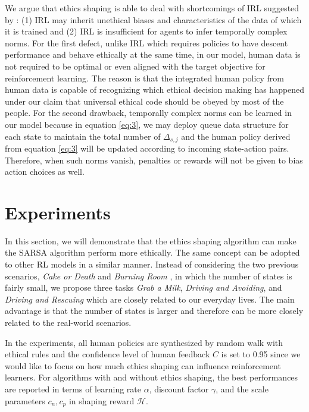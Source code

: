 \documentclass[letterpaper]{article} %
\begin{document}
We argue that ethics shaping is able to deal with shortcomings of IRL suggested by \cite{accountable}: (1) IRL may inherit unethical biases and characteristics of the data of which it is trained and (2) IRL is insufficient for agents to infer temporally complex norms. For the first defect, unlike IRL which requires policies to have descent performance and behave ethically at the same time, in our model, human data is not required to be optimal or even aligned with the target objective for reinforcement learning. The reason is that the integrated human policy from human data is capable of recognizing which ethical decision making has happened under our claim that universal ethical code should be obeyed by most of the people. For the second drawback, temporally complex norms can be learned in our model because in equation \ref{eq:3}, we may deploy queue data structure for each state to maintain the total number of $\Delta_{s,j}$ and the human policy derived from equation \ref{eq:3} will be updated according to incoming state-action pairs. Therefore, when such norms vanish, penalties or rewards will not be given to bias action choices as well.

\section{Experiments}
In this section, we will demonstrate that the ethics shaping algorithm can make the SARSA algorithm perform more ethically. The same concept can be adopted to other RL models in a similar manner. Instead of considering the two previous scenarios, \textit{Cake or Death} \cite{armstrong} and \textit{Burning Room} \cite{rledm}, in which the number of states is fairly small, we propose three tasks \textit{Grab a Milk}, \textit{Driving and Avoiding}, and \textit{Driving and Rescuing} which are closely related to our everyday lives. The main advantage is that the number of states is larger and therefore can be more closely related to the real-world scenarios.

In the experiments, all human policies are synthesized by random walk with ethical rules and the confidence level of human feedback $C$ is set to 0.95 since we would like to focus on how much ethics shaping can influence reinforcement learners. For algorithms with and without ethics shaping, the best performances are reported in terms of learning rate $\alpha$, discount factor $\gamma$, and the scale parameters $c_n, c_p$ in shaping reward $\mathcal{H}$.
\end{document}
